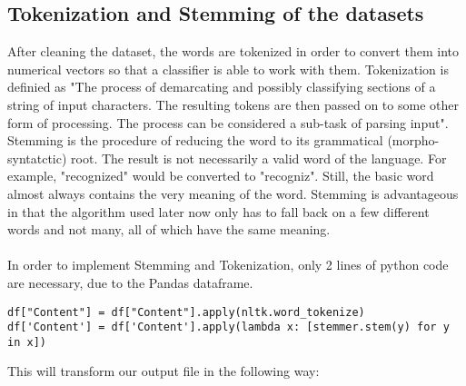 \documentclass[11pt,titlepage,oneside,openany]{book}
\begin{document}
\subsection{Tokenization and Stemming of the datasets}
After cleaning the dataset, the words are tokenized in order to convert them into numerical vectors so that a classifier is able to work with them. Tokenization is definied as "The process of demarcating and possibly classifying sections of a string of input characters. The resulting tokens are then passed on to some other form of processing. The process can be considered a sub-task of parsing input".\\
\noindent Stemming is the procedure of reducing the word to its grammatical (morpho-syntatctic) root. The result is not necessarily a valid word of the language. For example, "recognized" would be converted to "recogniz". Still, the basic word almost always contains the very meaning of the word. Stemming is advantageous in that the algorithm used later now only has to fall back on a few different words and not many, all of which have the same meaning.\\
\\
\noindent In order to implement Stemming and Tokenization, only 2 lines of python code are necessary, due to the Pandas dataframe. 
\begin{lstlisting}[frame=single]
df["Content"] = df["Content"].apply(nltk.word_tokenize)
df['Content'] = df['Content'].apply(lambda x: [stemmer.stem(y) for y in x])
\end{lstlisting}
This will transform our output file in the following way:
\begin{figure}[h]
\end{figure}

\newpage


\pagestyle{empty}
\end{document}
